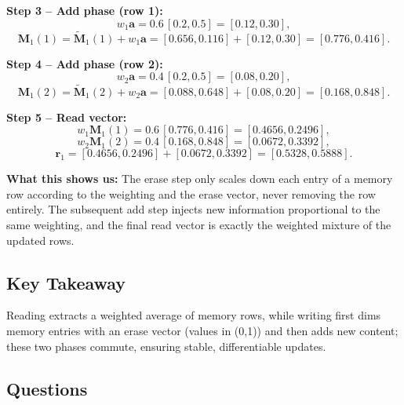 \documentclass[12pt, a4paper]{article}
\begin{document}
\textbf{Step 3 -- Add phase (row 1):}  
\[
w_1\mathbf{a} = 0.6\,[0.2,0.5] = [0.12,0.30],
\]  
\[
\mathbf{M}_1(1) = \tilde{\mathbf{M}}_1(1) + w_1\mathbf{a}
               = [0.656,0.116] + [0.12,0.30]
               = [0.776,0.416].
\]

\textbf{Step 4 -- Add phase (row 2):}  
\[
w_2\mathbf{a} = 0.4\,[0.2,0.5] = [0.08,0.20],
\]  
\[
\mathbf{M}_1(2) = \tilde{\mathbf{M}}_1(2) + w_2\mathbf{a}
               = [0.088,0.648] + [0.08,0.20]
               = [0.168,0.848].
\]

\textbf{Step 5 -- Read vector:}  
\[
w_1\mathbf{M}_1(1) = 0.6\,[0.776,0.416] = [0.4656,0.2496],
\]  
\[
w_2\mathbf{M}_1(2) = 0.4\,[0.168,0.848] = [0.0672,0.3392],
\]  
\[
\mathbf{r}_1 = [0.4656,0.2496] + [0.0672,0.3392]
            = [0.5328,0.5888].
\]

\textbf{What this shows us:}  
The erase step only scales down each entry of a memory row according to the weighting and the erase vector, never removing the row entirely.  
The subsequent add step injects new information proportional to the same weighting, and the final read vector is exactly the weighted mixture of the updated rows.

\subsection{Key Takeaway}
Reading extracts a weighted average of memory rows, while writing first dims memory entries with an erase vector (values in (0,1)) and then adds new content; these two phases commute, ensuring stable, differentiable updates.

\newpage
\subsection*{Questions}
\end{document}
